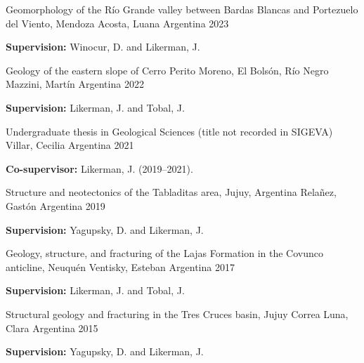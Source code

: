 \begin{cventries}
\cventry
    {Geomorphology of the Río Grande valley between Bardas Blancas and Portezuelo del Viento, Mendoza}
    {Acosta, Luana}
    {Argentina}
    {2023}
    {
      \begin{cvitems}
        \item {\textbf{Supervision:} Winocur, D. and Likerman, J.}
      \end{cvitems}
    }

\cventry
    {Geology of the eastern slope of Cerro Perito Moreno, El Bolsón, Río Negro}
    {Mazzini, Martín}
    {Argentina}
    {2022}
    {
      \begin{cvitems}
        \item {\textbf{Supervision:} Likerman, J. and Tobal, J.}
      \end{cvitems}
    }

\cventry
    {Undergraduate thesis in Geological Sciences (title not recorded in SIGEVA)}
    {Villar, Cecilia}
    {Argentina}
    {2021}
    {
      \begin{cvitems}
        \item {\textbf{Co-supervisor:} Likerman, J. (2019--2021).}
      \end{cvitems}
    }

\cventry
    {Structure and neotectonics of the Tabladitas area, Jujuy, Argentina}
    {Relañez, Gastón}
    {Argentina}
    {2019}
    {
      \begin{cvitems}
        \item {\textbf{Supervision:} Yagupsky, D. and Likerman, J.}
      \end{cvitems}
    }

\cventry
    {Geology, structure, and fracturing of the Lajas Formation in the Covunco anticline, Neuquén}
    {Ventisky, Esteban}
    {Argentina}
    {2017}
    {
      \begin{cvitems}
        \item {\textbf{Supervision:} Likerman, J. and Tobal, J.}
      \end{cvitems}
    }

\cventry
    {Structural geology and fracturing in the Tres Cruces basin, Jujuy}
    {Correa Luna, Clara}
    {Argentina}
    {2015}
    {
      \begin{cvitems}
        \item {\textbf{Supervision:} Yagupsky, D. and Likerman, J.}
      \end{cvitems}
    }
\end{cventries}
